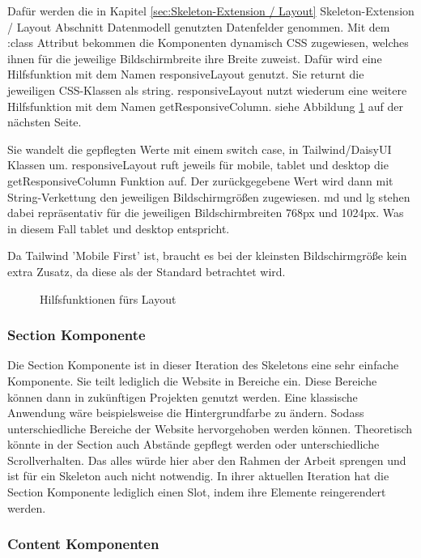 Dafür werden die in Kapitel \ref{sec:Skeleton-Extension / Layout} Skeleton-Extension / Layout Abschnitt Datenmodell genutzten Datenfelder genommen. Mit dem :class Attribut bekommen die Komponenten dynamisch CSS zugewiesen, welches ihnen für die jeweilige Bildschirmbreite ihre Breite zuweist. Dafür wird eine Hilfsfunktion mit dem Namen responsiveLayout genutzt. Sie returnt die jeweiligen CSS-Klassen als string. responsiveLayout nutzt wiederum eine weitere Hilfsfunktion mit dem Namen getResponsiveColumn. siehe Abbildung \ref{fig:Hilfunktionen fürs Layout} auf der nächsten Seite.

Sie wandelt die gepflegten Werte mit einem switch case, in Tailwind/DaisyUI Klassen um. responsiveLayout ruft jeweils für mobile, tablet und desktop die getResponsiveColumn Funktion auf. Der zurückgegebene Wert wird dann mit String-Verkettung den jeweiligen Bildschirmgrößen zugewiesen. md und lg stehen dabei repräsentativ für die jeweiligen Bildschirmbreiten 768px und 1024px. Was in diesem Fall tablet und desktop entspricht. 

Da Tailwind 'Mobile First' ist, braucht es bei der kleinsten Bildschirmgröße kein extra Zusatz, da diese als der Standard betrachtet wird.

\begin{figure}[htb]
\centering
{}
\caption{Hilfsfunktionen fürs Layout}
\label{fig:Hilfunktionen fürs Layout}
\end{figure}

\subsubsection{Section Komponente}
\label{sec:Section Komponente}

Die Section Komponente ist in dieser Iteration des Skeletons eine sehr einfache Komponente. Sie teilt lediglich die Website in Bereiche ein. Diese Bereiche können dann in zukünftigen Projekten genutzt werden. Eine klassische Anwendung wäre beispielsweise die Hintergrundfarbe zu ändern. Sodass unterschiedliche Bereiche der Website hervorgehoben werden können. Theoretisch könnte in der Section auch Abstände gepflegt werden oder unterschiedliche Scrollverhalten. Das alles würde hier aber den Rahmen der Arbeit sprengen und ist für ein Skeleton auch nicht notwendig. In ihrer aktuellen Iteration hat die Section Komponente lediglich einen Slot, indem ihre Elemente reingerendert werden.

\subsubsection{Content Komponenten}
\label{sec:Content Komponenten}

